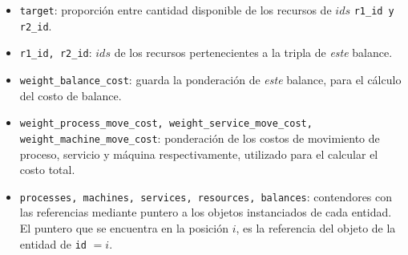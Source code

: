 \documentclass[../informe2.tex]{subfiles}
\begin{document}
\noindent\begin{minipage}{0.5\textwidth}
	\small
	\begin{itemize}
		\item \texttt{target}: proporción entre cantidad disponible de los recursos de $ids$ \texttt{r1\_id y r2\_id}.
		\item \texttt{r1\_id, r2\_id}: $ids$ de los recursos pertenecientes a la tripla de \textit{este} balance.
		\item \texttt{weight\_balance\_cost}: guarda la ponderación de \textit{este} balance, para el cálculo del costo de balance.
	\end{itemize}
\end{minipage}\hfill
\begin{minipage}{0.4\textwidth}
\end{minipage}

\bigskip

\noindent\begin{minipage}{0.4\textwidth}
\end{minipage}\hfill
\begin{minipage}{0.5\textwidth}
	\small
	\begin{itemize}
		\item \texttt{weight\_process\_move\_cost, weight\_service\_move\_cost, weight\_machine\_move\_cost}: ponderación de los costos de movimiento de proceso, servicio y máquina respectivamente, utilizado para el calcular el costo total.
		\item \texttt{processes, machines, services, resources, balances}: contendores con las referencias mediante puntero a los objetos instanciados de cada entidad. El puntero que se encuentra en la posición $i$, es la referencia del objeto de la entidad de \texttt{id} $=i$.
	\end{itemize}
\end{minipage}
\end{document}
